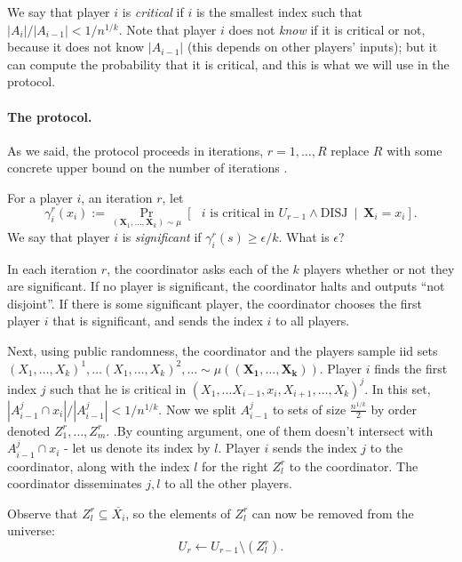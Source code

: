 \documentclass{article}
\newcommand{\coloneq}{:=}
\newcommand{\eps}{\epsilon}
\newcommand{\TODO}[1]{ {\color{red} #1 }}
\newcommand{\given}{\medspace \middle| \medspace}
\newcommand{\rv}[1]{\mathbf{#1}}
\theoremstyle{plain}
\begin{document}
We say that player $i$ is \emph{critical} if $i$ is the smallest index such that $|A_i| / |A_{i-1}| < 1/n^{1/k}$.
Note that player $i$ does not \emph{know} if it is critical or not, because it does not know $|A_{i-1}|$ (this depends on other players' inputs);
but it can compute the probability that it is critical, and this is what we will use in the protocol.

\paragraph{The protocol.}
As we said, the protocol proceeds in iterations, $r = 1,\ldots,R$
\TODO{replace $R$ with some concrete upper bound on the number of iterations}.

For a player $i$, an iteration $r$,
let
\begin{equation*}
  \gamma_i^r(x_i) \coloneq \Pr_{(\rv{X}_1,\ldots,\rv{X}_k) \sim \mu}\left[ \text{ $i$ is critical in $U_{r-1}$} \land \text{DISJ} \given \rv{X}_i = x_i \right].
\end{equation*}
We say that player $i$ is \emph{significant} if $\gamma_i^r(s) \geq \eps / k$.
\TODO{What is $\eps$?}

In each iteration $r$, the coordinator asks each of the $k$ players whether or not they are significant.
If no player is significant, the coordinator halts and outputs ``not disjoint''.
If there is some significant player, the coordinator chooses the first player $i$ that is significant,
and sends the index $i$ to all players.

Next, using public randomness, the coordinator and the players sample
iid sets $(X_1, \ldots , X_k)^1, \ldots (X_1, \ldots , X_k)^2,\ldots \sim \mu((\rv{X_1}, \ldots , \rv{X_k}))$.
Player $i$ finds the first index $j$ such that he is critical in $(X_1, \ldots X_{i-1}, x_i, X_{i+1}, \ldots , X_k)^j$. In this set, $|A_{i-1}^j \cap x_i| / |A_{i-1}^j| < 1/n^{1/k}$. Now we split $A_{i-1}^j$ to sets of size $\frac{n^{1/k}}{2}$ by order denoted $Z^{r}_1, \ldots , Z^{r}_m$. .By counting argument, one of them doesn't intersect with $A_{i-1}^j \cap x_i$ - let us denote its index by $l$. Player $i$ sends the index $j$ to the coordinator, along with the index $l$ for the right $Z^{r}_l$ to the coordinator.
The coordinator disseminates $j, l$ to all the other players.

Observe that $Z^{r}_l \subseteq \overline{X_i}$,
so the elements of $Z^{r}_l$ can now be removed from the universe:
\begin{equation*}
  U_r \leftarrow U_{r-1} \setminus (Z^{r}_l).
\end{equation*}
\end{document}
